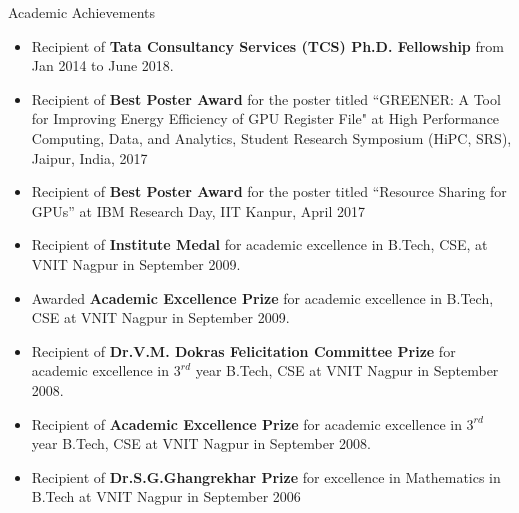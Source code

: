 \documentclass{resume} %
\begin{document}
\begin{comment}
\begin{rSection}{Ph.D Thesis}{\hspace{6 mm}   \textit{Thesis Supervisor : Prof. Amey Karkare, Department of CSE, IIT Kanpur }}

\begin{itemize}
\item \textbf{Title:} Hardware and Software Optimizations for GPU Resource Management
\end{itemize}

\end{rSection}
\end{comment}



\begin{rSection}{Academic Achievements}
\begin{itemize}
\item Recipient of \textbf{Tata Consultancy Services (TCS) Ph.D. Fellowship} from Jan 2014 to June 2018.
\item Recipient of \textbf{Best Poster Award} for the poster titled ``GREENER: A Tool for Improving Energy Efficiency of GPU Register File" at High Performance Computing, Data, and Analytics, Student Research Symposium (HiPC, SRS), Jaipur, India, 2017
\item Recipient of \textbf{Best Poster Award} for the poster titled “Resource Sharing for GPUs” at IBM Research Day, IIT Kanpur, April 2017
\item Recipient of \textbf{Institute Medal} for academic excellence in B.Tech, CSE,  at VNIT Nagpur in September 2009.
\item Awarded \textbf{Academic Excellence Prize} for academic excellence in B.Tech, CSE at VNIT Nagpur in September 2009.
\item Recipient of \textbf{Dr.V.M. Dokras Felicitation Committee Prize} for academic excellence in $3^{rd}$ year B.Tech, CSE at VNIT Nagpur in September 2008.
\item Recipient of \textbf{Academic Excellence Prize} for academic excellence in $3^{rd}$ year B.Tech, CSE at VNIT Nagpur in September 2008.
\item Recipient of \textbf{Dr.S.G.Ghangrekhar Prize} for excellence in Mathematics in B.Tech at VNIT Nagpur in September 2006
\end{itemize}
\end{rSection}
\end{document}
